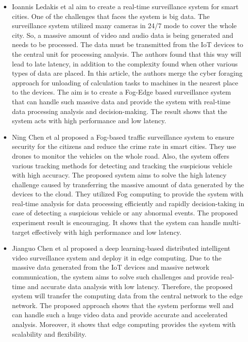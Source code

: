 \documentclass[12pt]{article}
\begin{document}
\begin{itemize}
\item Ioannis Ledakis et al \cite{ledakis2018adaptive} aim to create a real-time surveillance system for smart cities. One of the challenges that faces the system is big data. The surveillance system utilized many cameras in 24/7 mode to cover the whole city. So, a massive amount of video and audio data is being generated and needs to be processed. The data must be transmitted from the IoT devices to the central unit for processing analysis. The authors found that this way will lead to late latency, in addition to the complexity found when other various types of data are placed. In this article, the authors merge the cyber foraging approach for unloading of calculation tasks to machines in the nearest place to the devices. The aim is to create a Fog-Edge based surveillance system that can handle such massive data and provide the system with real-time data processing analysis and decision-making. The result shows that the system acts with high performance and low latency. 
\newpage
\item Ning Chen et al \cite{chen2016dynamic} proposed a Fog-based traffic surveillance system to ensure security for the citizens and reduce the crime rate in smart cities. They use drones to monitor the vehicles on the whole road. Also, the system offers various tracking methods for detecting and tracking the suspicious vehicle with high accuracy. The proposed system aims to solve the high latency challenge caused by transferring the massive amount of data generated by the devices to the cloud. They utilized Fog computing to provide the system with real-time analysis for data processing efficiently and rapidly decision-taking in case of detecting a suspicious vehicle or any abnormal events. The proposed experiment result is encouraging. It shows that the system can handle multi-target effectively with high performance and low latency.

\item Jianguo Chen et al \cite{chen2019distributed} proposed a deep learning-based distributed intelligent video surveillance system and deploy it in edge computing. Due to the massive data generated from the IoT devices and massive network communication, the system aims to solve such challenges and provide real-time and accurate data analysis with low latency. Therefore, the proposed system will transfer the computing data from the central network to the edge network. The proposed approach shows that the system performs well and can handle such a huge video data and provide accurate and accelerated analysis. Moreover, it shows that edge computing provides the system with scalability and flexibility.


\end{itemize}
\end{document}
